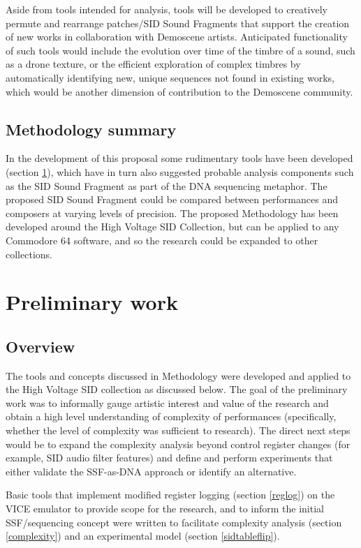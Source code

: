 \documentclass[10pt]{article}
\begin{document}
\begin{multicols*}{2}
Aside from tools intended for analysis, tools will be developed to creatively permute and rearrange patches/SID Sound Fragments that support the creation of new works in collaboration with Demoscene artists. Anticipated functionality of such tools would include the evolution over time of the timbre of a sound, such as a drone texture, or the efficient exploration of complex timbres by automatically identifying new, unique sequences not found in existing works, which would be another dimension of contribution to the Demoscene community.

\subsection{Methodology summary}

In the development of this proposal some rudimentary tools have been developed (section \ref{prelim}), which have in turn also suggested probable analysis components such as the SID Sound Fragment as part of the DNA sequencing metaphor. The proposed SID Sound Fragment could be compared between performances and composers at varying levels of precision. The proposed Methodology has been developed around the High Voltage SID Collection, but can be applied to any Commodore 64 software, and so the research could be expanded to other collections.

\section{Preliminary work}
\label{prelim}

\subsection{Overview}
\label{prelimover}

The tools and concepts discussed in Methodology were developed and applied to the High Voltage SID collection as discussed below. The goal of the preliminary work was to informally gauge artistic interest and value of the research and obtain a high level understanding of complexity of performances (specifically, whether the level of complexity was sufficient to research). The direct next steps would be to expand the complexity analysis beyond control register changes (for example, SID audio filter features) and define and perform experiments that either validate the SSF-as-DNA approach or identify an alternative.

Basic tools that implement modified register logging (section \ref{reglog}) on the VICE emulator\cite{asidvice} to provide scope for the research, and to inform the initial SSF/sequencing concept were written to facilitate complexity analysis (section \ref{complexity}) and an experimental model (section \ref{sidtableflip}). 


\end{multicols*}
\end{document}
